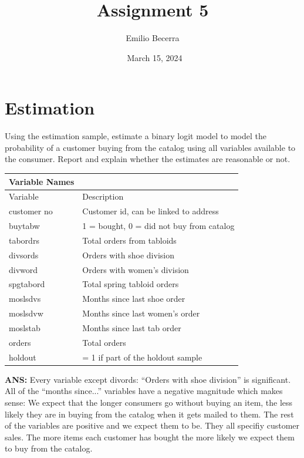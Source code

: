 \documentclass[a4paper,12pt]{article}
\begin{document}
\title{Assignment 5}
\author{Emilio Becerra}
\date{\ March 15, 2024}
\maketitle

\section{Estimation}
Using the estimation sample, estimate a binary logit model to model the
probability of a customer buying from the catalog using all variables available to the
consumer. Report and explain whether the estimates are reasonable or not.
\vspace{12pt}
\begin{table}[H] \centering
\begin{tabular}{ll}
Variable Names \\
\hline
Variable & Description\\
\hline
customer no & Customer id, can be linked to address \\
buytabw & 1 = bought, 0 = did not buy from catalog \\
tabordrs & Total orders from tabloids \\
divsords & Orders with shoe division \\
divword & Orders with women’s division \\
spgtabord & Total spring tabloid orders \\ 
moslsdvs & Months since last shoe order \\
moslsdvw & Months since last women’s order \\
moslstab & Months since last tab order \\ 
orders  & Total orders \\
holdout & = 1 if part of the holdout sample \\
\hline
\end{tabular}
\end{table}

\vspace{12pt}
\textbf{ANS:} 
Every variable except divords: ``Orders with shoe division'' is significant.
All of the ``months since...'' variables have a negative magnitude which makes sense:
We expect that the longer consumers go without buying an item, the less likely they 
are in buying from the catalog when it gets mailed to them. The rest of the variables
are positive and we expect them to be. They all specifiy customer sales. The more items
each customer has bought the more likely we expect them to buy from the catalog.
\end{document}
